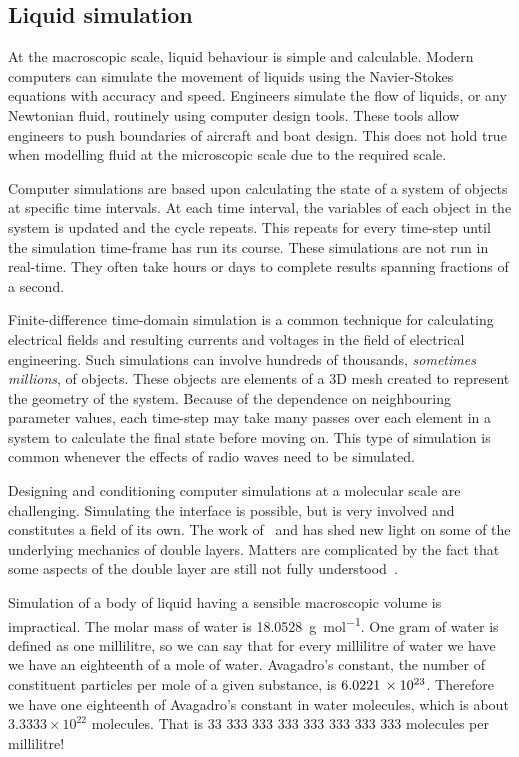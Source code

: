   \subsection{Liquid simulation}
    \label{sub:molecularSimulation}

    At the macroscopic scale, liquid behaviour is simple and calculable.
    Modern computers can simulate the movement of liquids using the Navier-Stokes equations with accuracy and speed.
    Engineers simulate the flow of liquids, or any Newtonian fluid, routinely using computer design tools.
    These tools allow engineers to push boundaries of aircraft and boat design.
    This does not hold true when modelling fluid at the microscopic scale due to the required scale.

    Computer simulations are based upon calculating the state of a system of objects at specific time intervals.
    At each time interval, the variables of each object in the system is updated and the cycle repeats.
    This repeats for every time-step until the simulation time-frame has run its course.
    These simulations are not run in real-time.
    They often take hours or days to complete results spanning fractions of a second.

    Finite-difference time-domain simulation is a common technique for calculating electrical fields and resulting currents and voltages in the field of electrical engineering.
    Such simulations can involve hundreds of thousands, \emph{sometimes millions}, of objects.
    These objects are elements of a 3D mesh created to represent the geometry of the system.
    Because of the dependence on neighbouring parameter values, each time-step may take many passes over each element in a system to calculate the final state before moving on.
    This type of simulation is common whenever the effects of radio waves need to be simulated.

    Designing and conditioning computer simulations at a molecular scale are challenging.
    Simulating the interface is possible, but is very involved and constitutes a field of its own.
    The work of~\cite{Nagy1992} and \cite{Bazant2011} has shed new light on some of the underlying mechanics of double layers.
    Matters are complicated by the fact that some aspects of the double layer are still not fully understood~\cite{Kornyshev2007}.

    Simulation of a body of liquid having a sensible macroscopic volume is impractical.
    The molar mass of water is \SI{18.0528}{\gram\per\mole}.
    One gram of water is defined as one millilitre, so we can say that for every millilitre of water we have we have an eighteenth of a mole of water.
    Avagadro's constant, the number of constituent particles per mole of a given substance, is $6.0221\thinspace \times 10^{23}$.
    Therefore we have one eighteenth of Avagadro's constant in water molecules, which is about $3.3333\times 10^{22}$ molecules.
    That is 33 333 333 333 333 333 333 333 molecules per millilitre!

